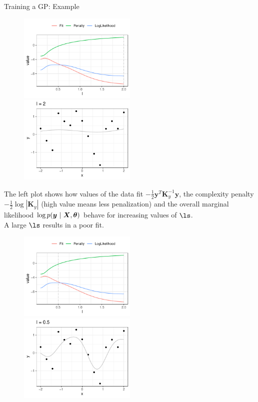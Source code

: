 \documentclass[11pt,compress,t,notes=noshow, xcolor=table]{beamer}
\begin{document}
\begin{vbframe}{Training a GP: Example}
\begin{figure}
	\includegraphics[width = 0.5\textwidth]{figure/gp_training/fit_vs_penalty_2.pdf}~	\includegraphics[width = 0.5\textwidth]{figure/gp_training/datapoints_2.pdf}
\end{figure}

\begin{footnotesize}
	The left plot shows how values of the data fit $-\frac{1}{2}\bm{y}^T\bm{K}_y^{-1} \bm{y}$, the complexity penalty $- \frac{1}{2} \log \left| \bm{K}_y \right|$ (high value means less penalization) and the overall marginal likelihood $\log p(\bm{y} ~|~ \bm{X}, \bm{\theta})$ behave for increasing values of $\ls$.\\ 
	A large $\ls$ results in a poor fit. 
\end{footnotesize}

\framebreak 

\begin{figure}
	\includegraphics[width = 0.5\textwidth]{figure/gp_training/fit_vs_penalty_0_5.pdf}~	\includegraphics[width = 0.5\textwidth]{figure/gp_training/datapoints_0_5.pdf}
\end{figure}


\end{vbframe}
\end{document}
